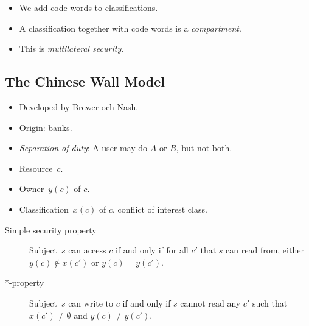 \begin{frame}
  \begin{definition}
    \begin{itemize}
      \item We add code words to classifications.
      \item A classification together with code words is a \emph{compartment}.
      \item This is \emph{multilateral security}.
    \end{itemize}
  \end{definition}
\end{frame}

\subsection{The Chinese Wall Model}
\begin{frame}
  \begin{idea}
    \begin{itemize}
      \item Developed by Brewer och Nash.
      \item Origin: banks.
      \item \emph{Separation of duty}:
        A user may do \(A\) or \(B\), but not both.
    \end{itemize}
  \end{idea}
\end{frame}

\begin{frame}
  \begin{definition}
    \begin{itemize}
      \item Resource~\(c\).
      \item Owner~\(y(c)\) of \(c\).
      \item Classification~\(x(c)\) of \(c\), conflict of interest class.
    \end{itemize}

    \begin{description}
      \item[Simple security property]
        Subject~\(s\) can access \(c\)
        if and only if
        for all \(c'\) that \(s\) can read from, either
        \(y(c)\notin x(c')\) or \(y(c) = y(c')\).

      \item[*-property] Subject~\(s\) can write to \(c\)
        if and only if
        \(s\) cannot read any \(c'\) such that \(x(c')\neq \emptyset\) and 
        \(y(c)\neq y(c')\).
    \end{description}
  \end{definition}
\end{frame}

